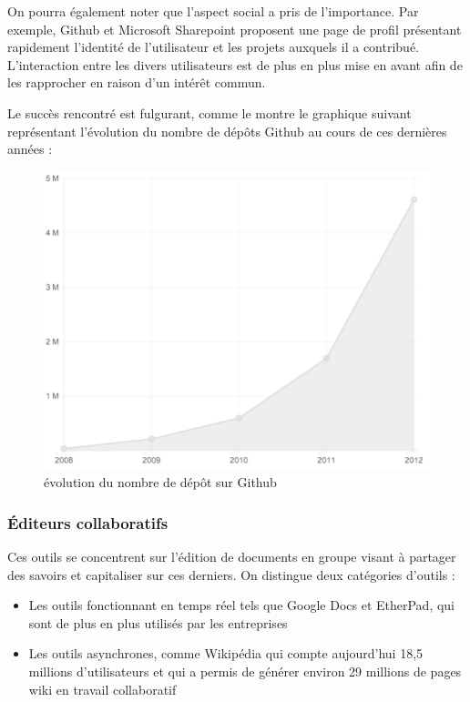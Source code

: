 \documentclass[10pt,twocolumn,a4paper,utf8x]{article}
\begin{document}
On pourra également noter que l'aspect social a pris de l'importance.
Par exemple, Github et Microsoft Sharepoint proposent une page de profil
présentant rapidement l'identité de l'utilisateur et les projets
auxquels il a contribué. L'interaction entre les divers utilisateurs est
de plus en plus mise en avant afin de les rapprocher en raison d'un
intérêt commun.

Le succès rencontré est fulgurant, comme le montre le graphique suivant
représentant l'évolution du nombre de dépôts Github au cours de ces
dernières années :

\begin{figure}[htbp]
\centering
\includegraphics[width=\hsize]{githubEvolutionDepot.png}
\caption{évolution du nombre de dépôt sur Github}
\end{figure}

\subsubsection{Éditeurs collaboratifs}

Ces outils se concentrent sur l'édition de documents en groupe visant à
partager des savoirs et capitaliser sur ces derniers. On distingue deux
catégories d'outils :

\begin{itemize}
\itemsep1pt\parskip0pt
\item
  Les outils fonctionnant en temps réel tels que Google Docs et
  EtherPad, qui sont de plus en plus utilisés par les entreprises
\item
  Les outils asynchrones, comme Wikipédia qui compte aujourd'hui 18,5
  millions d'utilisateurs et qui a permis de générer environ 29 millions
  de pages wiki en travail collaboratif
\end{itemize}
\end{document}
